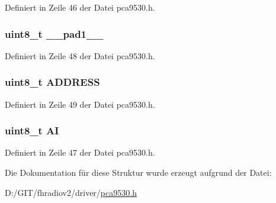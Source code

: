 Definiert in Zeile 46 der Datei pca9530.\+h.

\hypertarget{structpca9530__ctl_a77f12d2e278bd5c07712648ac0df5e08}{}
\subsubsection[{\+\_\+\+\_\+pad1\+\_\+\+\_\+}]{\setlength{\rightskip}{0pt plus 5cm}uint8\+\_\+t \+\_\+\+\_\+pad1\+\_\+\+\_\+}\label{structpca9530__ctl_a77f12d2e278bd5c07712648ac0df5e08}


Definiert in Zeile 48 der Datei pca9530.\+h.

\hypertarget{structpca9530__ctl_af3bea2c4759f3d001950aba2a1f89810}{}
\subsubsection[{A\+D\+D\+R\+E\+S\+S}]{\setlength{\rightskip}{0pt plus 5cm}uint8\+\_\+t A\+D\+D\+R\+E\+S\+S}\label{structpca9530__ctl_af3bea2c4759f3d001950aba2a1f89810}


Definiert in Zeile 49 der Datei pca9530.\+h.

\hypertarget{structpca9530__ctl_a8782eaf4d6ff8b39d2ef058050c8a0e3}{}
\subsubsection[{A\+I}]{\setlength{\rightskip}{0pt plus 5cm}uint8\+\_\+t A\+I}\label{structpca9530__ctl_a8782eaf4d6ff8b39d2ef058050c8a0e3}


Definiert in Zeile 47 der Datei pca9530.\+h.



Die Dokumentation für diese Struktur wurde erzeugt aufgrund der Datei\+:\begin{DoxyCompactItemize}
\item 
D\+:/\+G\+I\+T/fhradiov2/driver/\hyperlink{pca9530_8h}{pca9530.\+h}\end{DoxyCompactItemize}
